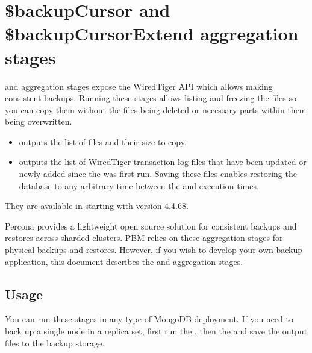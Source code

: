 \documentclass[letterpaper,10pt,english]{sphinxmanual}
\begin{document}
\chapter{\$backupCursor and \$backupCursorExtend aggregation stages}
\label{\detokenize{backup-cursor:backupcursor-and-backupcursorextend-aggregation-stages}}\label{\detokenize{backup-cursor:backup-cursor}}\label{\detokenize{backup-cursor::doc}}
\sphinxAtStartPar
{} and  aggregation stages expose the WiredTiger API which allows making consistent backups. Running these stages allows listing and freezing the files so you can copy them without the files being deleted or necessary parts within them being overwritten.
\begin{itemize}
\item {} 
\sphinxAtStartPar
{} outputs the list of files and their size to copy.

\item {} 
\sphinxAtStartPar
{} outputs the list of WiredTiger transaction log files that have been updated or newly added since the  was first run. Saving these files enables restoring the database to any arbitrary time between the  and  execution times.

\end{itemize}

\sphinxAtStartPar
They are available in  starting with version 4.4.6\sphinxhyphen{}8.

\sphinxAtStartPar
Percona provides  \textendash{} a light\sphinxhyphen{}weight open source solution for consistent backups and restores across sharded clusters. PBM relies on these aggregation stages for physical backups and restores. However, if you wish to develop your own backup application, this document describes the  and  aggregation stages.


\section{Usage}
\label{\detokenize{backup-cursor:usage}}
\sphinxAtStartPar
You can run these stages in any type of MongoDB deployment. If you need to back up a single node in a replica set, first run the , then the  and save the output files to the backup storage.
\end{document}
